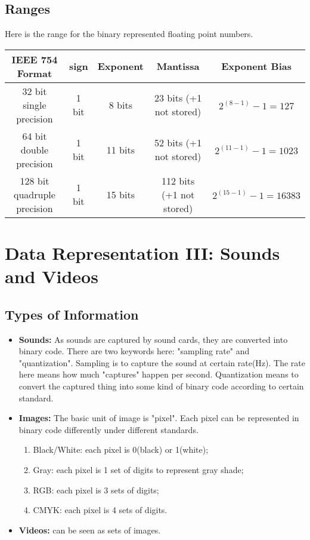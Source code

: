 \documentclass{article}
\begin{document}
\subsection{Ranges}
Here is the range for the binary represented floating point numbers.
\begin{center}
    \begin{tabular}{|c|c|c|c|c|}
    \hline
    IEEE 754 Format & sign & Exponent & Mantissa & Exponent Bias \\
    \hline
    32 bit single precision & 1 bit & 8 bits & 23 bits (+1 not stored) & $2^{(8-1)}-1=127$ \\
    \hline
    64 bit double precision & 1 bit & 11 bits & 52 bits (+1 not stored) & $2^{(11-1)}-1=1023$ \\
    \hline
    128 bit quadruple precision & 1 bit & 15 bits & 112 bits (+1 not stored) & $2^{(15-1)}-1=16383$ \\
    \hline
\end{tabular}
\end{center}

\section{Data Representation III: Sounds and Videos}
\subsection{Types of Information}
\begin{itemize}
    \item \textbf{Sounds:} As sounds are captured by sound cards, they are converted into binary code. There are two keywords here: "sampling rate" and "quantization". Sampling is to capture the sound at certain rate(Hz). The rate here means how much "captures" happen per second. Quantization means to convert the captured thing into some kind of binary code according to certain standard.
    \item \textbf{Images: } The basic unit of image is "pixel". Each pixel can be represented in binary code differently under different standards. 
        \begin{enumerate}
            \item Black/White: each pixel is 0(black) or 1(white);
            \item Gray: each pixel is 1 set of digits to represent gray shade;
            \item RGB: each pixel is 3 sets of digits;
            \item CMYK: each pixel is 4 sets of digits.
        \end{enumerate}
    \item \textbf{Videos: }can be seen as sets of images.
\end{itemize}
\end{document}
